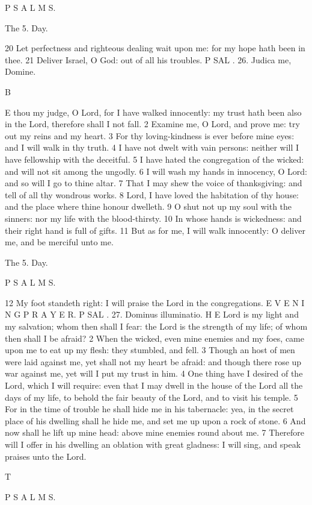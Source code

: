 P S A L M S.

The 5. Day.

20 Let perfectness and righteous dealing wait upon me: for my hope hath been in thee. 21 Deliver Israel, O God: out of all his troubles. P SAL . 26. Judica me, Domine.

B

E thou my judge, O Lord, for I have walked innocently: my trust hath been also in the Lord, therefore shall I not fall. 2 Examine me, O Lord, and prove me: try out my reins and my heart. 3 For thy loving-kindness is ever before mine eyes: and I will walk in thy truth. 4 I have not dwelt with vain persons: neither will I have fellowship with the deceitful. 5 I have hated the congregation of the wicked: and will not sit among the ungodly. 6 I will wash my hands in innocency, O Lord: and so will I go to thine altar. 7 That I may shew the voice of thanksgiving: and tell of all thy wondrous works. 8 Lord, I have loved the habitation of thy house: and the place where thine honour dwelleth. 9 O shut not up my soul with the sinners: nor my life with the blood-thirsty. 10 In whose hands is wickedness: and their right hand is full of gifts. 11 But as for me, I will walk innocently: O deliver me, and be merciful unto me.

The 5. Day.

P S A L M S.

12 My foot standeth right: I will praise the Lord in the congregations. E V E N I N G P R A Y E R. P SAL . 27. Dominus illuminatio. H E Lord is my light and my salvation; whom then shall I fear: the Lord is the strength of my life; of whom then shall I be afraid? 2 When the wicked, even mine enemies and my foes, came upon me to eat up my flesh: they stumbled, and fell. 3 Though an host of men were laid against me, yet shall not my heart be afraid: and though there rose up war against me, yet will I put my trust in him. 4 One thing have I desired of the Lord, which I will require: even that I may dwell in the house of the Lord all the days of my life, to behold the fair beauty of the Lord, and to visit his temple. 5 For in the time of trouble he shall hide me in his tabernacle: yea, in the secret place of his dwelling shall he hide me, and set me up upon a rock of stone. 6 And now shall he lift up mine head: above mine enemies round about me. 7 Therefore will I offer in his dwelling an oblation with great gladness: I will sing, and speak praises unto the Lord.

T

P S A L M S.

